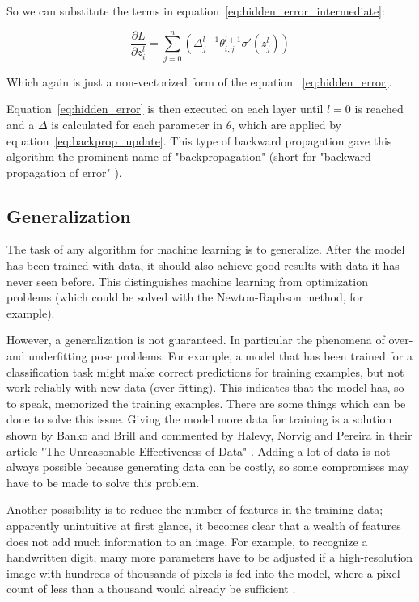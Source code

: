 So we can substitute the terms in equation~\eqref{eq:hidden_error_intermediate}:

\begin{equation}
    \frac{\partial L}{\partial z^l_i} = \sum_{j=0}^n (\varDelta^{l+1}_j \theta^{l+1}_{i,j} \sigma'(z_j^l))
\end{equation}

Which again is just a non-vectorized form of the equation ~\eqref{eq:hidden_error}.

Equation~\eqref{eq:hidden_error} is then executed on each layer until $l=0$ is reached and a $\varDelta$ is calculated for each parameter in $\theta$, which are applied by equation~\eqref{eq:backprop_update}.
This type of backward propagation gave this algorithm the prominent name of "backpropagation" (short for "backward propagation of error" \cite{Rumelhart1986}).

\subsection{Generalization}

The task of any algorithm for machine learning is to generalize.
After the model has been trained with data, it should also achieve good results with data it has never seen before.
This distinguishes machine learning from optimization problems (which could be solved with the Newton-Raphson method, for example).

However, a generalization is not guaranteed. In particular the phenomena of over- and underfitting  pose problems.
For example, a model that has been trained for a classification task might make correct predictions for training examples, but not work reliably with new data (over fitting).
This indicates that the model has, so to speak, memorized the training examples.
There are some things which can be done to solve this issue.
Giving the model more data for training is a solution shown by Banko and Brill \cite {Banko2001} and commented by Halevy, Norvig and Pereira in their article "The Unreasonable Effectiveness of Data" \cite{Halevy2009}.
Adding a lot of data is not always possible because generating data can be costly, so some compromises may have to be made to solve this problem.

Another possibility is to reduce the number of features in the training data; apparently unintuitive at first glance, it becomes clear that a wealth of features does not add much information to an image. For example, to recognize a handwritten digit, many more parameters have to be adjusted if a high-resolution image with hundreds of thousands of pixels is fed into the model, where a pixel count of less than a thousand would already be sufficient \cite{Nielsen2015}.

